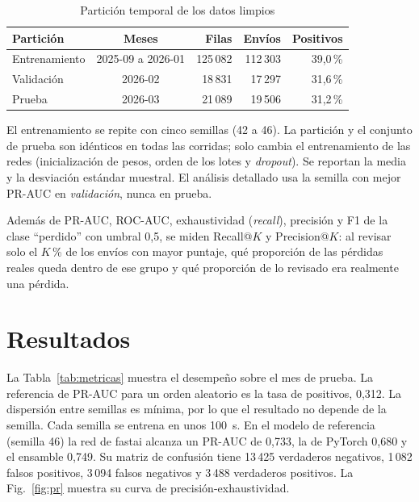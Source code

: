 \documentclass[conference]{IEEEtran}
\begin{document}
\begin{table}[htbp]
\caption{Partición temporal de los datos limpios}
\label{tab:particion}
\centering
\footnotesize
\begin{tabular}{lcrrr}
\toprule
\textbf{Partición} & \textbf{Meses} & \textbf{Filas} & \textbf{Envíos} & \textbf{Positivos}\\
\midrule
Entrenamiento & 2025-09 a 2026-01 & 125\,082 & 112\,303 & 39,0\,\%\\
Validación & 2026-02 & 18\,831 & 17\,297 & 31,6\,\%\\
Prueba & 2026-03 & 21\,089 & 19\,506 & 31,2\,\%\\
\bottomrule
\end{tabular}
\end{table}

El entrenamiento se repite con cinco semillas (42 a 46). La partición y el
conjunto de prueba son idénticos en todas las corridas; solo cambia el
entrenamiento de las redes (inicialización de pesos, orden de los lotes y
\textit{dropout}). Se reportan la media y la desviación estándar muestral. El
análisis detallado usa la semilla con mejor PR-AUC en \emph{validación}, nunca
en prueba.

Además de PR-AUC, ROC-AUC, exhaustividad (\textit{recall}), precisión y F1 de
la clase ``perdido'' con umbral 0,5, se miden Recall@$K$ y Precision@$K$: al
revisar solo el $K$\,\% de los envíos con mayor puntaje, qué proporción de las
pérdidas reales queda dentro de ese grupo y qué proporción de lo revisado era
realmente una pérdida.

\section{Resultados}

La Tabla~\ref{tab:metricas} muestra el desempeño sobre el mes de prueba. La
referencia de PR-AUC para un orden aleatorio es la tasa de positivos, 0,312.
La dispersión entre semillas es mínima, por lo que el resultado no depende de
la semilla. Cada semilla se entrena en unos 100~s. En el modelo de referencia
(semilla 46) la red de fastai alcanza un PR-AUC de 0,733, la de PyTorch 0,680
y el ensamble 0,749. Su matriz de confusión tiene 13\,425 verdaderos
negativos, 1\,082 falsos positivos, 3\,094 falsos negativos y 3\,488 verdaderos
positivos. La Fig.~\ref{fig:pr} muestra su curva de precisión-exhaustividad.
\end{document}
